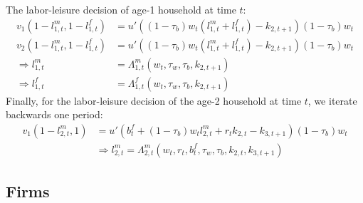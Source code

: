 \documentclass[BufferStockTheory]{subfiles}
\begin{document}
 The labor-leisure decision of age-1 household at time $t$:
\begin{subequations}
\label{eq:labor1_t}
	\begin{align}
		v_1(1-l_{1,t}^m,1-l_{1,t}^f)&=u'\left((1-\tau_b)w_t (l_{1,t}^m +l_{1,t}^f) -k_{2,t+1}\right)(1-\tau_b)w_t \label{eq:optimallabormale_t}\\
v_2(1-l_{1,t}^m,1-l_{1,t}^f)&=u'\left((1-\tau_b)w_t (l_{1,t}^m +l_{1,t}^f) -k_{2,t+1}\right)(1-\tau_b)w_t 
\label{eq:optimallaborfemale_t}\\
\Rightarrow  
	l_{1,t}^m&=\Lambda_{1,t}^m(w_t,\tau_w,\tau_b,k_{2,t+1}) \label{eq:laborpolicymale_t}\\
\Rightarrow	
	l_{1,t}^f&=\Lambda_{1,t}^f(w_t,\tau_w,\tau_b,k_{2,t+1}) \label{eq:laborpolicyfemale_t}
	\end{align}
\end{subequations}
Finally, for the labor-leisure decision of the age-2 household at time $t$, we iterate backwards one period:
\begin{subequations}
\label{eq:labor2_t}
	\begin{align}
v_1(1-l_{2,t}^m,1)&=u'\left(b_{t}^f+(1-\tau_b)w_{t} l_{2,t}^m  + r_{t}k_{2,t} -k_{3,t+1}\right)(1-\tau_b)w_{t}		 \label{eq:optimallabormale2_t}\\
&\Rightarrow  
l_{2,t}^m =\Lambda_{2,t}^m(w_{t},r_{t},b_{t}^f, \tau_w,\tau_b,k_{2,t},k_{3,t+1})	\label{eq:laborpolicymale2_t}
	\end{align}
\end{subequations}

\subsection{Firms}
\end{document}
